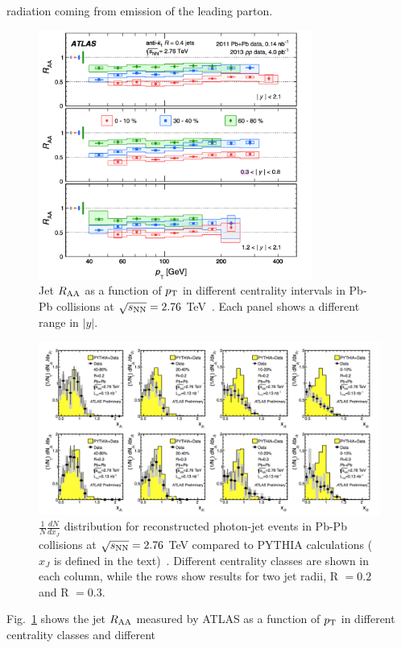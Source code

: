radiation coming from emission of the leading parton.\\
\begin{figure}[!ht]
  \centering
  \includegraphics[width=9cm]{FigCap1/ATLASjetsRaa.png}
  \caption{Jet $R_{\rm AA}$ as a function of $p_{\rm T}$ in different centrality
intervals in Pb-Pb collisions at $\sqrt{s_{\rm NN}} = 2.76$ TeV~\cite{Aad:2014bxa}. Each panel shows a different range in $|y|$.}
  \label{fig:ATLASjetsRaa}
\end{figure}
\begin{figure}[!ht]
  \centering
  \includegraphics[width=15cm]{FigCap1/ATLASdiijetGammaZ.png}
  \caption{$\frac{1}{N}\frac{dN}{dx_J}$ distribution for reconstructed photon-jet events in Pb-Pb collisions at $\sqrt{s_{\rm NN}} = 2.76$ TeV compared to PYTHIA calculations ($x_J$ is defined in the text)~\cite{ATLAS-CONF-2012-121}. Different centrality classes are shown in each column, while the rows show results for two jet radii, R $= 0.2$ and R $=0.3$.}
  \label{fig:ATLASdijetAsymm}
\end{figure} 
Fig.~\ref{fig:ATLASjetsRaa} shows the jet $R_{\rm AA}$ measured by ATLAS 
as a function of $p_{\rm T}$ in different centrality classes and different 
